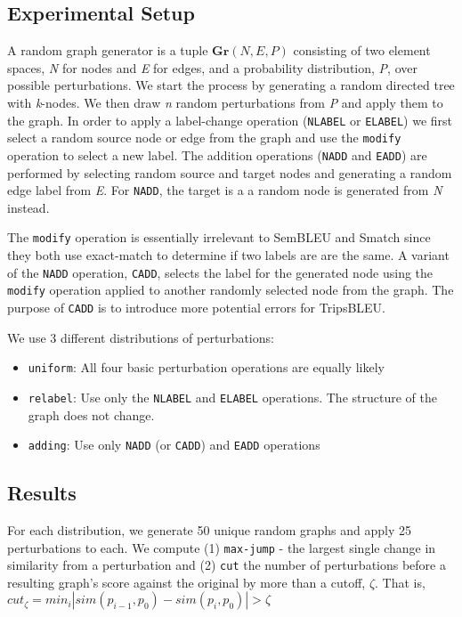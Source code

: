 \documentclass[11pt]{article}
\begin{document}
\subsection{Experimental Setup}
\label{sec:org71a7d98}

A random graph generator is a tuple \(\mathbf{Gr}(N, E, P)\) consisting of two element spaces, \emph{N} for nodes and \emph{E} for edges, and a probability distribution, \emph{P}, over possible perturbations. We start the process by generating a random
directed tree with \emph{k}-nodes. We then draw \emph{n} random perturbations from \emph{P} and apply them to the graph. In order to apply a label-change operation (\texttt{NLABEL} or \texttt{ELABEL}) we first select a random
source node or edge from the graph and use the \texttt{modify} operation to select a new label. The addition operations (\texttt{NADD} and \texttt{EADD}) are performed by selecting random source and target nodes and generating a random edge label from \emph{E}.
For \texttt{NADD}, the target is a a random node is generated from \emph{N} instead.

The \texttt{modify} operation is essentially irrelevant to SemBLEU and Smatch since they both use exact-match to determine if two labels are are the same.
A variant of the \texttt{NADD} operation, \texttt{CADD}, selects the label for the generated node using the \texttt{modify} operation applied to another randomly selected node from the graph.
The purpose of \texttt{CADD} is to introduce more potential errors for TripsBLEU.

We use 3 different distributions of perturbations:
\begin{itemize}
\item \texttt{uniform}: All four basic perturbation operations are equally likely
\item \texttt{relabel}: Use only the \texttt{NLABEL} and \texttt{ELABEL} operations. The structure of the graph does not change.
\item \texttt{adding}: Use only \texttt{NADD} (or \texttt{CADD}) and \texttt{EADD} operations
\end{itemize}

\subsection{Results}
\label{sec:org048fccf}
For each distribution, we generate 50 unique random graphs and apply 25 perturbations to each. We compute (1) \texttt{max-jump} - the largest single change in similarity from a perturbation and (2) \texttt{cut} the number of perturbations before a resulting graph's score against the original by more than a cutoff, \(\zeta\). That is, \({cut}_{\zeta} = {min}_i |{sim}(p_{i-1}, p_0) - {sim}(p_i, p_0)| > \zeta\)
\end{document}
